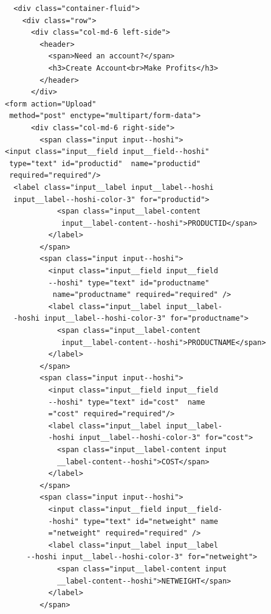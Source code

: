 \documentclass[BTech]{srmuthesis}
\begin{document}
\begin{verbatim}
  <div class="container-fluid">
    <div class="row">
      <div class="col-md-6 left-side">
        <header>
          <span>Need an account?</span>
          <h3>Create Account<br>Make Profits</h3>
        </header>
      </div>
<form action="Upload"
 method="post" enctype="multipart/form-data">
      <div class="col-md-6 right-side">
        <span class="input input--hoshi">
<input class="input__field input__field--hoshi"
 type="text" id="productid"  name="productid" 
 required="required"/>
  <label class="input__label input__label--hoshi 
  input__label--hoshi-color-3" for="productid">
            <span class="input__label-content
             input__label-content--hoshi">PRODUCTID</span>
          </label>
        </span>
        <span class="input input--hoshi">
          <input class="input__field input__field
          --hoshi" type="text" id="productname"
           name="productname" required="required" />
          <label class="input__label input__label-
  -hoshi input__label--hoshi-color-3" for="productname">
            <span class="input__label-content
             input__label-content--hoshi">PRODUCTNAME</span>
          </label>
        </span>
        <span class="input input--hoshi">
          <input class="input__field input__field
          --hoshi" type="text" id="cost"  name
          ="cost" required="required"/>
          <label class="input__label input__label-
          -hoshi input__label--hoshi-color-3" for="cost">
            <span class="input__label-content input
            __label-content--hoshi">COST</span>
          </label>
        </span>
        <span class="input input--hoshi">
          <input class="input__field input__field-
          -hoshi" type="text" id="netweight" name
          ="netweight" required="required" />
          <label class="input__label input__label
     --hoshi input__label--hoshi-color-3" for="netweight">
            <span class="input__label-content input
            __label-content--hoshi">NETWEIGHT</span>
          </label>
        </span>
 

\end{verbatim}
\end{document}
